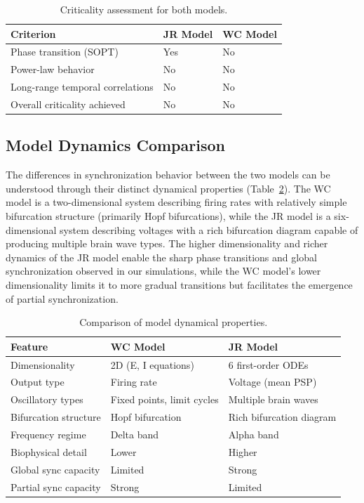 \documentclass[12pt]{article}
\begin{document}
\begin{table}[H]
\centering
\caption{Criticality assessment for both models.}
\label{tab:criticality}
\begin{tabular}{lll}
\toprule
Criterion & JR Model & WC Model \\
\midrule
Phase transition (SOPT) & Yes & No \\
Power-law behavior & No & No \\
Long-range temporal correlations & No & No \\
Overall criticality achieved & No & No \\
\bottomrule
\end{tabular}
\end{table}

\subsection{Model Dynamics Comparison}

The differences in synchronization behavior between the two models can be understood through their distinct dynamical properties (Table~\ref{tab:dynamics}). The WC model is a two-dimensional system describing firing rates with relatively simple bifurcation structure (primarily Hopf bifurcations), while the JR model is a six-dimensional system describing voltages with a rich bifurcation diagram capable of producing multiple brain wave types. The higher dimensionality and richer dynamics of the JR model enable the sharp phase transitions and global synchronization observed in our simulations, while the WC model's lower dimensionality limits it to more gradual transitions but facilitates the emergence of partial synchronization.

\begin{table}[H]
\centering
\caption{Comparison of model dynamical properties.}
\label{tab:dynamics}
\begin{tabular}{lll}
\toprule
Feature & WC Model & JR Model \\
\midrule
Dimensionality & 2D (E, I equations) & 6 first-order ODEs \\
Output type & Firing rate & Voltage (mean PSP) \\
Oscillatory types & Fixed points, limit cycles & Multiple brain waves \\
Bifurcation structure & Hopf bifurcation & Rich bifurcation diagram \\
Frequency regime & Delta band & Alpha band \\
Biophysical detail & Lower & Higher \\
Global sync capacity & Limited & Strong \\
Partial sync capacity & Strong & Limited \\
\bottomrule
\end{tabular}
\end{table}
\end{document}
